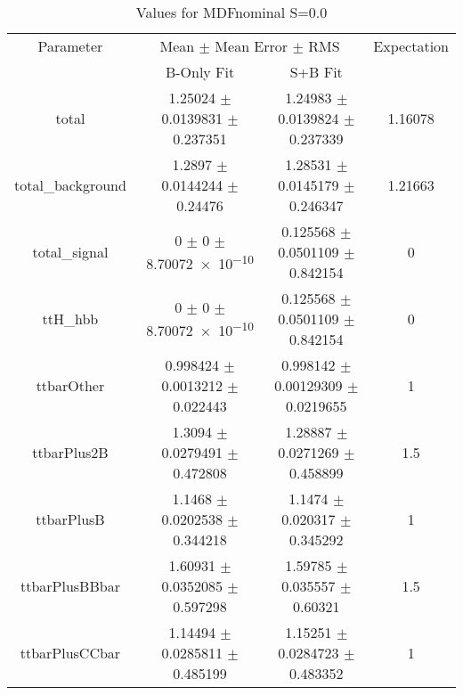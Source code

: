 \begin{table}
\centering
\caption{Values for MDFnominal S=0.0}
\begin{tabular}{cccc}
\toprule
Parameter & \multicolumn{2}{c}{Mean $\pm$ Mean Error $\pm$ RMS} & Expectation\\
 & B-Only Fit & S+B Fit & \\
\midrule
total & \num{1.25024} $\pm$ \num{0.0139831} $\pm$ \num{0.237351} & \num{1.24983} $\pm$ \num{0.0139824} $\pm$ \num{0.237339} & \num{1.16078}\\
total\_background & \num{1.2897} $\pm$ \num{0.0144244} $\pm$ \num{0.24476} & \num{1.28531} $\pm$ \num{0.0145179} $\pm$ \num{0.246347} & \num{1.21663}\\
total\_signal & \num{0} $\pm$ \num{0} $\pm$ \num{8.70072e-10} & \num{0.125568} $\pm$ \num{0.0501109} $\pm$ \num{0.842154} & \num{0}\\
ttH\_hbb & \num{0} $\pm$ \num{0} $\pm$ \num{8.70072e-10} & \num{0.125568} $\pm$ \num{0.0501109} $\pm$ \num{0.842154} & \num{0}\\
ttbarOther & \num{0.998424} $\pm$ \num{0.0013212} $\pm$ \num{0.022443} & \num{0.998142} $\pm$ \num{0.00129309} $\pm$ \num{0.0219655} & \num{1}\\
ttbarPlus2B & \num{1.3094} $\pm$ \num{0.0279491} $\pm$ \num{0.472808} & \num{1.28887} $\pm$ \num{0.0271269} $\pm$ \num{0.458899} & \num{1.5}\\
ttbarPlusB & \num{1.1468} $\pm$ \num{0.0202538} $\pm$ \num{0.344218} & \num{1.1474} $\pm$ \num{0.020317} $\pm$ \num{0.345292} & \num{1}\\
ttbarPlusBBbar & \num{1.60931} $\pm$ \num{0.0352085} $\pm$ \num{0.597298} & \num{1.59785} $\pm$ \num{0.035557} $\pm$ \num{0.60321} & \num{1.5}\\
ttbarPlusCCbar & \num{1.14494} $\pm$ \num{0.0285811} $\pm$ \num{0.485199} & \num{1.15251} $\pm$ \num{0.0284723} $\pm$ \num{0.483352} & \num{1}\\
\bottomrule
\end{tabular}
\end{table}
